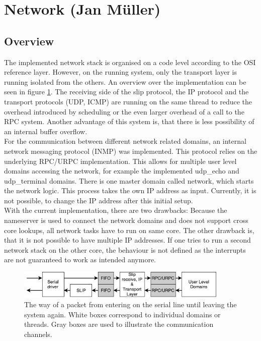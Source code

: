 \section{Network (Jan Müller)}\label{s:network}
\subsection{Overview}
The implemented network stack is organised on a code level according to the OSI reference layer. However, on the running system, only the transport layer is running isolated from the others. An overview over the implementation can be seen in figure \ref{f:network_overview}. The receiving side of the slip protocol, the IP protocol and the transport protocols (UDP, ICMP) are running on the same thread to reduce the overhead introduced by scheduling or the even larger overhead of a call to the RPC system. Another advantage of this system is, that there is less possibility of an internal buffer overflow.\\
For the communication between different network related domains, an internal network messaging protocol (INMP) was implemented. This protocol relies on the underlying RPC/URPC implementation. This allows for multiple user level domains accessing the network, for example the implemented udp\_echo and udp\_terminal domains. There is one master domain called network, which starts the network logic. This process takes the own IP address as input. Currently, it is not possible, to change the IP address after this initial setup. \\
With the current implementation, there are two drawbacks: Because the nameserver is used to connect the network domains and does not support cross core lookups, all network tasks have to run on same core. The other drawback is, that it is not possible to have multiple IP addresses. If one tries to run a second network stack on the other core, the behaviour is not defined as the interrupts are not guaranteed to work as intended anymore.

\begin{figure}
\centering
	\includegraphics[width=0.9\textwidth]{Images/Packet_flow}
	\caption{The way of a packet from entering on the serial line until leaving the system again. White boxes correspond to individual domains or threads. Gray boxes are used to illustrate the communication channels.\label{f:network_overview}}
\end{figure}

